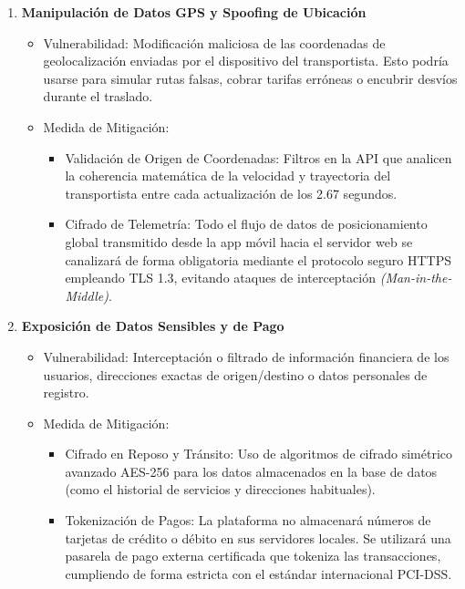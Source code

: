 \begin{enumerate}
	\item \textbf{Manipulación de Datos GPS y Spoofing de Ubicación }
	\begin{itemize}
		\item Vulnerabilidad: Modificación maliciosa de las coordenadas de geolocalización enviadas por el dispositivo del transportista. Esto podría usarse para simular rutas falsas, cobrar tarifas erróneas o encubrir desvíos durante el traslado.
		\item Medida de Mitigación:
		\begin{itemize}
			\item Validación de Origen de Coordenadas: Filtros en la API que analicen la coherencia matemática de la velocidad y trayectoria del transportista entre cada actualización de los 2.67 segundos.
			\item Cifrado de Telemetría: Todo el flujo de datos de posicionamiento global transmitido desde la app móvil hacia el servidor web se canalizará de forma obligatoria mediante el protocolo seguro HTTPS empleando TLS 1.3, evitando ataques de interceptación \textit{(Man-in-the-Middle)}.
		\end{itemize}
	\end{itemize}
	
	\item \textbf{Exposición de Datos Sensibles y de Pago}
	\begin{itemize}
		\item Vulnerabilidad: Interceptación o filtrado de información financiera de los usuarios, direcciones exactas de origen/destino o datos personales de registro.
		\item Medida de Mitigación:
		\begin{itemize}
			\item Cifrado en Reposo y Tránsito: Uso de algoritmos de cifrado simétrico avanzado AES-256 para los datos almacenados en la base de datos (como el historial de servicios y direcciones habituales).
			\item Tokenización de Pagos: La plataforma no almacenará números de tarjetas de crédito o débito en sus servidores locales. Se utilizará una pasarela de pago externa certificada que tokeniza las transacciones, cumpliendo de forma estricta con el estándar internacional PCI-DSS.
		\end{itemize}
	\end{itemize}
	

\end{enumerate}
